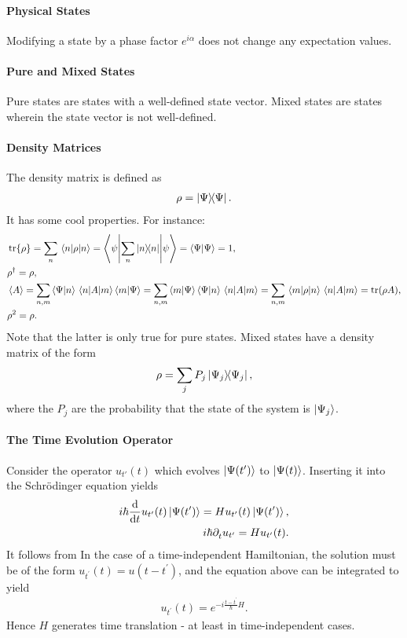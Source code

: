 \paragraph{Physical States}
Modifying a state by a phase factor $e^{i\alpha}$ does not change any expectation values.

\paragraph{Pure and Mixed States}
Pure states are states with a well-defined state vector. Mixed states are states wherein the state vector is not well-defined.

\paragraph{Density Matrices}
The density matrix is defined as
\begin{align*}
	\rho = \op{\Psi}{\Psi}.
\end{align*}
It has some cool properties. For instance:
\begin{align*}
	&\tr{\rho} = \sum\limits_{n}\expval{\rho}{n} = \ev**{\sum\limits_{n}\op{n}{n}}{\psi} = \braket{\Psi} = 1, \\
	&\adj{\rho} = \rho, \\
	&\expval{A} = \sum\limits_{n, m}\braket{\Psi}{n}\mel{n}{A}{m}\braket{m}{\Psi} = \sum\limits_{n, m}\braket{m}{\Psi}\braket{\Psi}{n}\mel{n}{A}{m} = \sum\limits_{n, m}\mel{m}{\rho}{n}\mel{n}{A}{m} = \tr(\rho A), \\
	&\rho^{2} = \rho.
\end{align*}
Note that the latter is only true for pure states. Mixed states have a density matrix of the form
\begin{align*}
	\rho = \sum\limits_{j}P_{j}\op{\Psi_{j}}{\Psi_{j}},
\end{align*}
where the $P_{j}$ are the probability that the state of the system is $\ket{\Psi_{j}}$.

\paragraph{The Time Evolution Operator}
Consider the operator $u_{t'}(t)$ which evolves $\ket{\Psi(t')}$ to $\ket{\Psi(t)}$. Inserting it into the Schrödinger equation yields
\begin{align*}
	i\hbar\dv{t}u_{t^{\prime}}(t)\ket{\Psi(t^{\prime})} = Hu_{t^{\prime}}(t)\ket{\Psi(t^{\prime})}, \\
	i\hbar\partial_{t}^{}u_{t^{\prime}} = Hu_{t^{\prime}}(t).
\end{align*}
It follows from In the case of a time-independent Hamiltonian, the solution must be of the form $u_{t^{\prime}}(t) = u(t - t^{\prime})$, and the equation above can be integrated to yield
\begin{align*}
	u_{t^{\prime}}(t) = e^{-i\frac{t - t^{\prime}}{\hbar}H}.
\end{align*}
Hence $H$ generates time translation - at least in time-independent cases.

